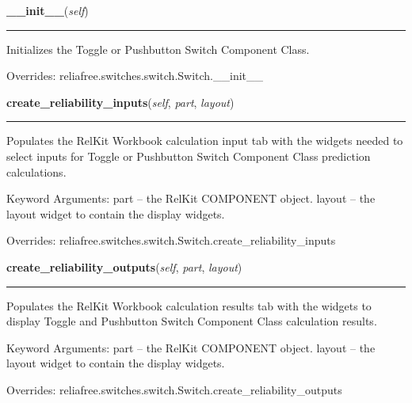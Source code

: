 \hspace{.8\funcindent}\begin{boxedminipage}{\funcwidth}

    \raggedright \textbf{\_\_init\_\_}(\textit{self})

    \vspace{-1.5ex}

    \rule{\textwidth}{0.5\fboxrule}
\setlength{\parskip}{2ex}
    Initializes the Toggle or Pushbutton Switch Component Class.

\setlength{\parskip}{1ex}
      Overrides: reliafree.switches.switch.Switch.\_\_init\_\_

    \end{boxedminipage}

    \vspace{0.5ex}

\hspace{.8\funcindent}\begin{boxedminipage}{\funcwidth}

    \raggedright \textbf{create\_reliability\_inputs}(\textit{self}, \textit{part}, \textit{layout})

    \vspace{-1.5ex}

    \rule{\textwidth}{0.5\fboxrule}
\setlength{\parskip}{2ex}
    Populates the RelKit Workbook calculation input tab with the widgets
    needed to select inputs for Toggle or Pushbutton Switch Component Class
    prediction calculations.

    Keyword Arguments: part   -- the RelKit COMPONENT object. layout -- 
    the layout widget to contain the display widgets.

\setlength{\parskip}{1ex}
      Overrides: reliafree.switches.switch.Switch.create\_reliability\_inputs

    \end{boxedminipage}

    \vspace{0.5ex}

\hspace{.8\funcindent}\begin{boxedminipage}{\funcwidth}

    \raggedright \textbf{create\_reliability\_outputs}(\textit{self}, \textit{part}, \textit{layout})

    \vspace{-1.5ex}

    \rule{\textwidth}{0.5\fboxrule}
\setlength{\parskip}{2ex}
    Populates the RelKit Workbook calculation results tab with the 
    widgets to display Toggle and Pushbutton Switch Component Class 
    calculation results.

    Keyword Arguments: part   -- the RelKit COMPONENT object. layout -- 
    the layout widget to contain the display widgets.

\setlength{\parskip}{1ex}
      Overrides: reliafree.switches.switch.Switch.create\_reliability\_outputs

    \end{boxedminipage}

